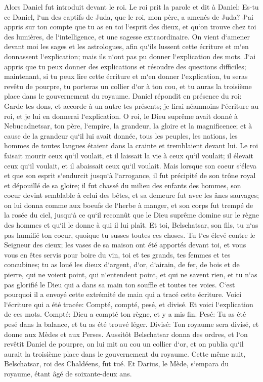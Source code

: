 \verse Alors Daniel fut introduit devant le roi. Le roi prit la parole et dit à Daniel: Es-tu ce Daniel, l`un des captifs de Juda, que le roi, mon père, a amenés de Juda? 
\verse J`ai appris sur ton compte que tu as en toi l`esprit des dieux, et qu`on trouve chez toi des lumières, de l`intelligence, et une sagesse extraordinaire. 
\verse On vient d`amener devant moi les sages et les astrologues, afin qu`ils lussent cette écriture et m`en donnassent l`explication; mais ils n`ont pas pu donner l`explication des mots. 
\verse J`ai appris que tu peux donner des explications et résoudre des questions difficiles; maintenant, si tu peux lire cette écriture et m`en donner l`explication, tu seras revêtu de pourpre, tu porteras un collier d`or à ton cou, et tu auras la troisième place dans le gouvernement du royaume. 
\verse Daniel répondit en présence du roi: Garde tes dons, et accorde à un autre tes présents; je lirai néanmoins l`écriture au roi, et je lui en donnerai l`explication. 
\verse O roi, le Dieu suprême avait donné à Nebucadnetsar, ton père, l`empire, la grandeur, la gloire et la magnificence; 
\verse et à cause de la grandeur qu`il lui avait donnée, tous les peuples, les nations, les hommes de toutes langues étaient dans la crainte et tremblaient devant lui. Le roi faisait mourir ceux qu`il voulait, et il laissait la vie à ceux qu`il voulait; il élevait ceux qu`il voulait, et il abaissait ceux qu`il voulait. 
\verse Mais lorsque son coeur s`éleva et que son esprit s`endurcit jusqu`à l`arrogance, il fut précipité de son trône royal et dépouillé de sa gloire; 
\verse il fut chassé du milieu des enfants des hommes, son coeur devint semblable à celui des bêtes, et sa demeure fut avec les ânes sauvages; on lui donna comme aux boeufs de l`herbe à manger, et son corps fut trempé de la rosée du ciel, jusqu`à ce qu`il reconnût que le Dieu suprême domine sur le règne des hommes et qu`il le donne à qui il lui plaît. 
\verse Et toi, Belschatsar, son fils, tu n`as pas humilié ton coeur, quoique tu susses toutes ces choses. 
\verse Tu t`es élevé contre le Seigneur des cieux; les vases de sa maison ont été apportés devant toi, et vous vous en êtes servis pour boire du vin, toi et tes grands, tes femmes et tes concubines; tu as loué les dieux d`argent, d`or, d`airain, de fer, de bois et de pierre, qui ne voient point, qui n`entendent point, et qui ne savent rien, et tu n`as pas glorifié le Dieu qui a dans sa main ton souffle et toutes tes voies. 
\verse C`est pourquoi il a envoyé cette extrémité de main qui a tracé cette écriture. 
\verse Voici l`écriture qui a été tracée: Compté, compté, pesé, et divisé. 
\verse Et voici l`explication de ces mots. Compté: Dieu a compté ton règne, et y a mis fin. 
\verse Pesé: Tu as été pesé dans la balance, et tu as été trouvé léger. 
\verse Divisé: Ton royaume sera divisé, et donne aux Mèdes et aux Perses. 
\verse Aussitôt Belschatsar donna des ordres, et l`on revêtit Daniel de pourpre, on lui mit au cou un collier d`or, et on publia qu`il aurait la troisième place dans le gouvernement du royaume. 
\verse Cette même nuit, Belschatsar, roi des Chaldéens, fut tué. 
\verse Et Darius, le Mède, s`empara du royaume, étant âgé de soixante-deux ans. 

